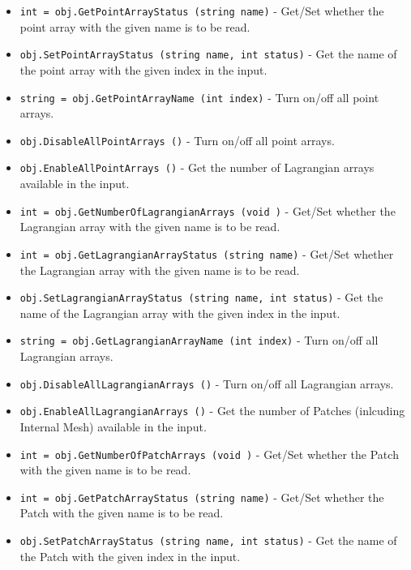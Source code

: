 \begin{itemize}
\item  \verb|int = obj.GetPointArrayStatus (string name)| -  Get/Set whether the point array with the given name is to
 be read.

\item  \verb|obj.SetPointArrayStatus (string name, int status)| -  Get the name of the  point array with the given index in
 the input.

\item  \verb|string = obj.GetPointArrayName (int index)| -  Turn on/off all point arrays.

\item  \verb|obj.DisableAllPointArrays ()| -  Turn on/off all point arrays.

\item  \verb|obj.EnableAllPointArrays ()| -  Get the number of Lagrangian arrays available in the input.

\item  \verb|int = obj.GetNumberOfLagrangianArrays (void )| -  Get/Set whether the Lagrangian array with the given name is to
 be read.

\item  \verb|int = obj.GetLagrangianArrayStatus (string name)| -  Get/Set whether the Lagrangian array with the given name is to
 be read.

\item  \verb|obj.SetLagrangianArrayStatus (string name, int status)| -  Get the name of the  Lagrangian array with the given index in
 the input.

\item  \verb|string = obj.GetLagrangianArrayName (int index)| -  Turn on/off all Lagrangian arrays.

\item  \verb|obj.DisableAllLagrangianArrays ()| -  Turn on/off all Lagrangian arrays.

\item  \verb|obj.EnableAllLagrangianArrays ()| -  Get the number of Patches (inlcuding Internal Mesh) available in the input.

\item  \verb|int = obj.GetNumberOfPatchArrays (void )| -  Get/Set whether the Patch with the given name is to
 be read.

\item  \verb|int = obj.GetPatchArrayStatus (string name)| -  Get/Set whether the Patch with the given name is to
 be read.

\item  \verb|obj.SetPatchArrayStatus (string name, int status)| -  Get the name of the Patch with the given index in
 the input.


\end{itemize}
